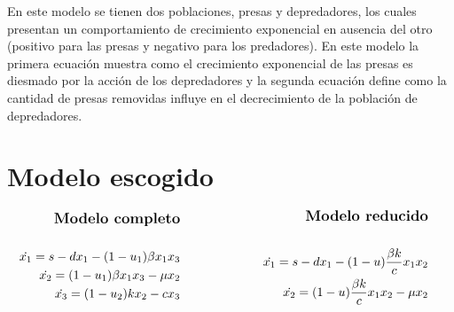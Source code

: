\documentclass{article}
\begin{document}
        \vspace{1cm}

        En este modelo se tienen dos poblaciones, presas y depredadores, los
        cuales presentan un comportamiento de crecimiento exponencial en
        ausencia del otro (positivo para las presas y negativo para los
        predadores). En este modelo la primera ecuación muestra como el
        crecimiento exponencial de las presas es diesmado por la acción de los
        depredadores y la segunda ecuación define como la cantidad de presas
        removidas influye en el decrecimiento de la población de depredadores.

\newpage

\section{Modelo escogido}

\begin{alignat*}{2}
    & \begin{aligned}
        \text{\textbf{\large Modelo completo}}\\\\
        \dot{x_1} = s -dx_1 - (1-u_1) \beta x_1 x_3\\
        \dot{x_2} = (1-u_1) \beta x_1 x_3 - \mu x_2\\
        \dot{x_3} = (1-u_2) k x_2 - c x_3
    \end{aligned}
    & \hspace{2cm}
    & \begin{aligned}
        \text{\textbf{\large Modelo reducido}}\\\\
        \dot{x_1} = s -dx_1 - (1-u) \frac{\beta k}{c} x_1 x_2\\
        \dot{x_2} = (1-u) \frac{\beta k}{c} x_1 x_2 - \mu x_2
    \end{aligned}
\end{alignat*}

\vspace{1cm}
\end{document}
